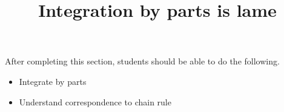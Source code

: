 \documentclass{ximera}
\title{Integration by parts is lame}
\begin{document}
\begin{abstract}
\end{abstract}

\maketitle

\begin{sectionOutcomes}

After completing this section, students should be able to do the following.

\begin{itemize}
\item Integrate by parts
\item Understand correspondence to chain rule
\end{itemize}

\end{sectionOutcomes}
\end{document}
